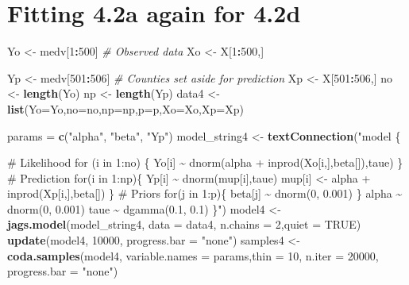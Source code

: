 \documentclass[
]{article}
\newenvironment{Shaded}{\begin{snugshade}}{\end{snugshade}}
\newcommand{\AttributeTok}[1]{\textcolor[rgb]{0.13,0.29,0.53}{#1}}
\newcommand{\CommentTok}[1]{\textcolor[rgb]{0.56,0.35,0.01}{\textit{#1}}}
\newcommand{\ConstantTok}[1]{\textcolor[rgb]{0.56,0.35,0.01}{#1}}
\newcommand{\DecValTok}[1]{\textcolor[rgb]{0.00,0.00,0.81}{#1}}
\newcommand{\FunctionTok}[1]{\textcolor[rgb]{0.13,0.29,0.53}{\textbf{#1}}}
\newcommand{\NormalTok}[1]{#1}
\newcommand{\OtherTok}[1]{\textcolor[rgb]{0.56,0.35,0.01}{#1}}
\newcommand{\SpecialCharTok}[1]{\textcolor[rgb]{0.81,0.36,0.00}{\textbf{#1}}}
\newcommand{\StringTok}[1]{\textcolor[rgb]{0.31,0.60,0.02}{#1}}
\begin{document}
\section{Fitting 4.2a again for 4.2d}\label{fitting-4.2a-again-for-4.2d}

\begin{Shaded}
\begin{Highlighting}[]
\NormalTok{Yo    }\OtherTok{\textless{}{-}}\NormalTok{ medv[}\DecValTok{1}\SpecialCharTok{:}\DecValTok{500}\NormalTok{]    }\CommentTok{\# Observed data}
\NormalTok{Xo    }\OtherTok{\textless{}{-}}\NormalTok{ X[}\DecValTok{1}\SpecialCharTok{:}\DecValTok{500}\NormalTok{,]}

\NormalTok{Yp    }\OtherTok{\textless{}{-}}\NormalTok{ medv[}\DecValTok{501}\SpecialCharTok{:}\DecValTok{506}\NormalTok{]     }\CommentTok{\# Counties set aside for prediction}
\NormalTok{Xp    }\OtherTok{\textless{}{-}}\NormalTok{ X[}\DecValTok{501}\SpecialCharTok{:}\DecValTok{506}\NormalTok{,]}
\NormalTok{no    }\OtherTok{\textless{}{-}} \FunctionTok{length}\NormalTok{(Yo)}
\NormalTok{np    }\OtherTok{\textless{}{-}} \FunctionTok{length}\NormalTok{(Yp)}
\NormalTok{data4 }\OtherTok{\textless{}{-}} \FunctionTok{list}\NormalTok{(}\AttributeTok{Yo=}\NormalTok{Yo,}\AttributeTok{no=}\NormalTok{no,}\AttributeTok{np=}\NormalTok{np,}\AttributeTok{p=}\NormalTok{p,}\AttributeTok{Xo=}\NormalTok{Xo,}\AttributeTok{Xp=}\NormalTok{Xp) }

\NormalTok{params }\OtherTok{=} \FunctionTok{c}\NormalTok{(}\StringTok{"alpha"}\NormalTok{, }\StringTok{"beta"}\NormalTok{, }\StringTok{"Yp"}\NormalTok{)}
\NormalTok{model\_string4 }\OtherTok{\textless{}{-}} \FunctionTok{textConnection}\NormalTok{(}\StringTok{"model \{}

\StringTok{  \# Likelihood}
\StringTok{  for (i in 1:no) \{}
\StringTok{    Yo[i] \textasciitilde{} dnorm(alpha + inprod(Xo[i,],beta[]),taue)}
\StringTok{  \}}
\StringTok{  }
\StringTok{    \# Prediction}
\StringTok{  for(i in 1:np)\{}
\StringTok{    Yp[i]  \textasciitilde{} dnorm(mup[i],taue)}
\StringTok{    mup[i] \textless{}{-} alpha + inprod(Xp[i,],beta[])}
\StringTok{  \}}
\StringTok{  \# Priors}
\StringTok{    for(j in 1:p)\{}
\StringTok{      beta[j] \textasciitilde{} dnorm(0, 0.001)}
\StringTok{    \}}
\StringTok{    alpha \textasciitilde{} dnorm(0, 0.001)}
\StringTok{    taue  \textasciitilde{} dgamma(0.1, 0.1)            }
\StringTok{\}"}\NormalTok{)}
\NormalTok{model4 }\OtherTok{\textless{}{-}} \FunctionTok{jags.model}\NormalTok{(model\_string4, }\AttributeTok{data =}\NormalTok{ data4, }\AttributeTok{n.chains =} \DecValTok{2}\NormalTok{,}\AttributeTok{quiet =} \ConstantTok{TRUE}\NormalTok{)}
\FunctionTok{update}\NormalTok{(model4, }\DecValTok{10000}\NormalTok{, }\AttributeTok{progress.bar =} \StringTok{"none"}\NormalTok{)}
\NormalTok{samples4 }\OtherTok{\textless{}{-}} \FunctionTok{coda.samples}\NormalTok{(model4, }\AttributeTok{variable.names =}\NormalTok{ params,}\AttributeTok{thin =} \DecValTok{10}\NormalTok{, }\AttributeTok{n.iter =} \DecValTok{20000}\NormalTok{, }\AttributeTok{progress.bar =} \StringTok{"none"}\NormalTok{)}
\end{Highlighting}
\end{Shaded}
\end{document}
